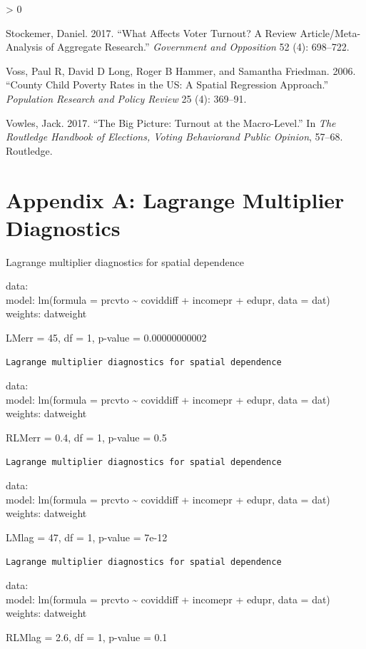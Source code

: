 \documentclass[
  12pt,
]{article}
\newlength{\cslhangindent}
\newenvironment{CSLReferences}[2] %
 {%
  \setlength{\parindent}{0pt}
  \ifodd #1 \everypar{\setlength{\hangindent}{\cslhangindent}}\ignorespaces\fi
  \ifnum #2 > 0
  \setlength{\parskip}{#2\baselineskip}
  \fi
 }%
 {}
\begin{document}
\begin{CSLReferences}{1}{0}
\leavevmode\hypertarget{ref-stockemer2017affects}{}%
Stockemer, Daniel. 2017. {``What Affects Voter Turnout? A Review
Article/Meta-Analysis of Aggregate Research.''} \emph{Government and
Opposition} 52 (4): 698--722.

\leavevmode\hypertarget{ref-voss2006county}{}%
Voss, Paul R, David D Long, Roger B Hammer, and Samantha Friedman. 2006.
{``County Child Poverty Rates in the US: A Spatial Regression
Approach.''} \emph{Population Research and Policy Review} 25 (4):
369--91.

\leavevmode\hypertarget{ref-vowles2017big}{}%
Vowles, Jack. 2017. {``The Big Picture: Turnout at the Macro-Level.''}
In \emph{The Routledge Handbook of Elections, Voting Behaviorand Public
Opinion}, 57--68. Routledge.

\end{CSLReferences}

\newpage

\hypertarget{appendix-a-lagrange-multiplier-diagnostics}{%
\section{Appendix A: Lagrange Multiplier
Diagnostics}\label{appendix-a-lagrange-multiplier-diagnostics}}

\normalsize

Lagrange multiplier diagnostics for spatial dependence

data:\\
model: lm(formula = prcvto \textasciitilde{} coviddiff + incomepr +
edupr, data = dat) weights: datweight

LMerr = 45, df = 1, p-value = 0.00000000002

\begin{verbatim}
Lagrange multiplier diagnostics for spatial dependence
\end{verbatim}

data:\\
model: lm(formula = prcvto \textasciitilde{} coviddiff + incomepr +
edupr, data = dat) weights: datweight

RLMerr = 0.4, df = 1, p-value = 0.5

\begin{verbatim}
Lagrange multiplier diagnostics for spatial dependence
\end{verbatim}

data:\\
model: lm(formula = prcvto \textasciitilde{} coviddiff + incomepr +
edupr, data = dat) weights: datweight

LMlag = 47, df = 1, p-value = 7e-12

\begin{verbatim}
Lagrange multiplier diagnostics for spatial dependence
\end{verbatim}

data:\\
model: lm(formula = prcvto \textasciitilde{} coviddiff + incomepr +
edupr, data = dat) weights: datweight

RLMlag = 2.6, df = 1, p-value = 0.1

\normalsize
\end{document}
